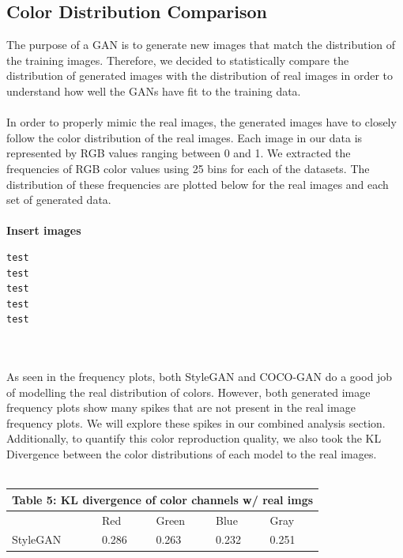 \documentclass[10pt]{article}
\begin{document}
\begin{multicols*}{2}
        \subsection{Color Distribution Comparison}
        \label{subsec:colorDistribution}
        The purpose of a GAN is to generate new images that match the distribution of the training images. Therefore, we decided to statistically compare the distribution of generated images with the distribution of real images in order to understand how well the GANs have fit to the training data.
        \\\\
        In order to properly mimic the real images, the generated images have to closely follow the color distribution of the real images. Each image in our data is represented by RGB values ranging between 0 and 1. We extracted the frequencies of RGB color values using 25 bins for each of the datasets. The distribution of these frequencies are plotted below for the real images and each set of generated data.
        \\\\
        \textbf{Insert images}
        \begin{verbatim}
test
test
test
test
test
\end{verbatim}
        \\\\
        As seen in the frequency plots, both StyleGAN and COCO-GAN do a good job of modelling the real distribution of colors.
        However, both generated image frequency plots show many spikes that are not present in the real image frequency plots.
        We will explore these spikes in our combined analysis section. Additionally, to quantify this color reproduction quality, we also took the KL Divergence between the color distributions of each model to the real images.\\\\
        \begin{tabular}{ |p{2cm}|p{1cm}|p{1cm}|p{1cm}|p{1cm}|  }
             \hline
             \multicolumn{5}{|c|}{Table 5: \textbf{KL divergence of color channels w/ real imgs}} \\
             \hline
            & Red & Green & Blue & Gray  \\
            \hline
            StyleGAN & 0.286    & 0.263      & 0.232     &  0.251 \\

\end{tabular}
\end{multicols*}
\end{document}
